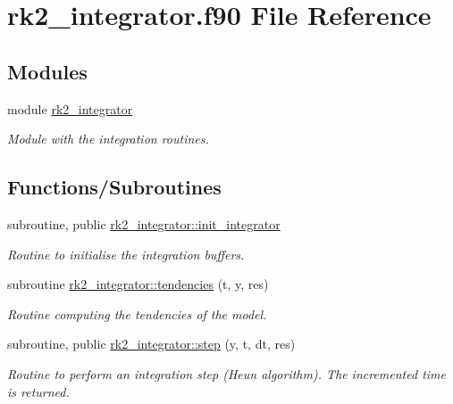 \hypertarget{rk2__integrator_8f90}{}\section{rk2\+\_\+integrator.\+f90 File Reference}
\label{rk2__integrator_8f90}
\subsection*{Modules}
\begin{DoxyCompactItemize}
\item 
module \hyperlink{namespacerk2__integrator}{rk2\+\_\+integrator}
\begin{DoxyCompactList}\small\item\em Module with the integration routines. \end{DoxyCompactList}\end{DoxyCompactItemize}
\subsection*{Functions/\+Subroutines}
\begin{DoxyCompactItemize}
\item 
subroutine, public \hyperlink{namespacerk2__integrator_a82d35c2f4ef4a10f35b0293c8f846132}{rk2\+\_\+integrator\+::init\+\_\+integrator}
\begin{DoxyCompactList}\small\item\em Routine to initialise the integration buffers. \end{DoxyCompactList}\item 
subroutine \hyperlink{namespacerk2__integrator_ab40d193bfee2f2187e1377b7656bd402}{rk2\+\_\+integrator\+::tendencies} (t, y, res)
\begin{DoxyCompactList}\small\item\em Routine computing the tendencies of the model. \end{DoxyCompactList}\item 
subroutine, public \hyperlink{namespacerk2__integrator_ac8a46245e033c195251cc4b8d75bb142}{rk2\+\_\+integrator\+::step} (y, t, dt, res)
\begin{DoxyCompactList}\small\item\em Routine to perform an integration step (Heun algorithm). The incremented time is returned. \end{DoxyCompactList}\end{DoxyCompactItemize}
